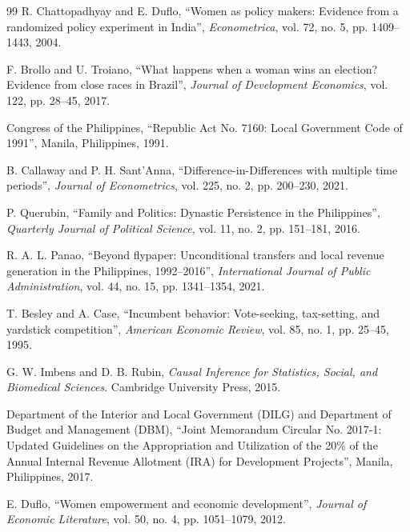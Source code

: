 \documentclass[conference]{IEEEtran}
\begin{document}
\begin{thebibliography}{99}
R. Chattopadhyay and E. Duflo, ``Women as policy makers: Evidence from a randomized policy experiment in India'', \textit{Econometrica}, vol. 72, no. 5, pp. 1409--1443, 2004.

F. Brollo and U. Troiano, ``What happens when a woman wins an election? Evidence from close races in Brazil'', \textit{Journal of Development Economics}, vol. 122, pp. 28--45, 2017.

Congress of the Philippines, ``Republic Act No. 7160: Local Government Code of 1991'', Manila, Philippines, 1991.

B. Callaway and P. H. Sant'Anna, ``Difference-in-Differences with multiple time periods'', \textit{Journal of Econometrics}, vol. 225, no. 2, pp. 200--230, 2021.

P. Querubin, ``Family and Politics: Dynastic Persistence in the Philippines'', \textit{Quarterly Journal of Political Science}, vol. 11, no. 2, pp. 151--181, 2016.

R. A. L. Panao, ``Beyond flypaper: Unconditional transfers and local revenue generation in the Philippines, 1992--2016'', \textit{International Journal of Public Administration}, vol. 44, no. 15, pp. 1341--1354, 2021.

T. Besley and A. Case, ``Incumbent behavior: Vote-seeking, tax-setting, and yardstick competition'', \textit{American Economic Review}, vol. 85, no. 1, pp. 25--45, 1995.

G. W. Imbens and D. B. Rubin, \textit{Causal Inference for Statistics, Social, and Biomedical Sciences}. Cambridge University Press, 2015.

Department of the Interior and Local Government (DILG) and Department of Budget and Management (DBM), ``Joint Memorandum Circular No. 2017-1: Updated Guidelines on the Appropriation and Utilization of the 20\% of the Annual Internal Revenue Allotment (IRA) for Development Projects'', Manila, Philippines, 2017.

E. Duflo, ``Women empowerment and economic development'', \textit{Journal of Economic Literature}, vol. 50, no. 4, pp. 1051--1079, 2012.
\end{thebibliography}
\end{document}
